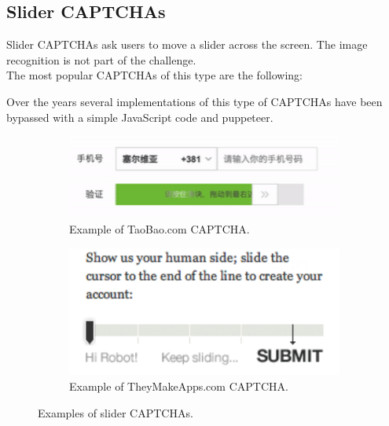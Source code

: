 \subsection{Slider CAPTCHAs}
Slider CAPTCHAs ask users to move a slider across the screen. The image recognition is not part of the challenge.\\
The most popular CAPTCHAs of this type are the following:
\begin{itemize}
\end{itemize}
Over the years several implementations of this type of CAPTCHAs have been bypassed with a simple JavaScript code and puppeteer.
\begin{figure}[h]
     \centering
     \begin{subfigure}[b]{0.48\textwidth}
         \centering
         \includegraphics[width=.8\linewidth]{Images/StateOfArt/taobao_CAPTCHA}
                  \caption{\footnotesize{Example of TaoBao.com CAPTCHA.}}
         \label{soa:slider}
     \end{subfigure}
     \hfill
     \begin{subfigure}[b]{0.48\textwidth}
         \centering
         \includegraphics[width=.8\linewidth]{Images/StateOfArt/theyMakeApps_CAPTCHA}
         \caption{\footnotesize{Example of TheyMakeApps.com CAPTCHA.}}
        \label{soa:slider2}
     \end{subfigure}
     \caption{\footnotesize{Examples of slider CAPTCHAs.}}
\end{figure}

